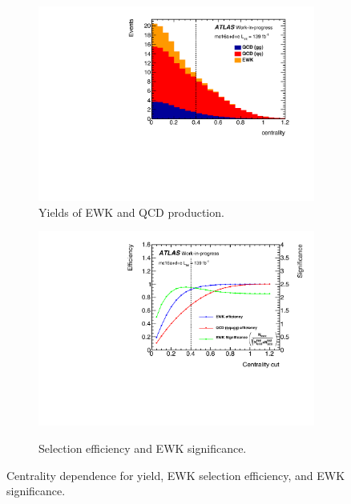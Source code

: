 \begin{figure}[!htbp]
\begin{subfigure}{.49\textwidth}
  \centering
  \includegraphics[width=.95\linewidth]{figures/AnalysisOverview/centrality_Dist.pdf}  
  \caption{Yields of EWK and QCD production.}
  \label{fig:centrality_a}
\end{subfigure}
\begin{subfigure}{.49\textwidth}
  \centering
  \includegraphics[width=.9\linewidth]{figures/AnalysisOverview/centrality_Cut.pdf}  \\
  \caption{Selection efficiency and EWK significance. }
  \label{fig:centrality_b}
\end{subfigure}
\caption{Centrality dependence for yield, EWK selection efficiency, and EWK significance. }
\end{figure}

